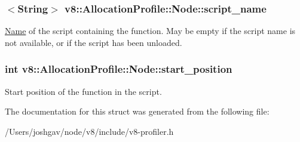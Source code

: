 \subsubsection[{\texorpdfstring{script\+\_\+name}{script_name}}]{$<${\bf String}$>$ v8\+::\+Allocation\+Profile\+::\+Node\+::script\+\_\+name}\hypertarget{structv8_1_1_allocation_profile_1_1_node_acd6567ac06a0bae713390559128e9c62}{}\label{structv8_1_1_allocation_profile_1_1_node_acd6567ac06a0bae713390559128e9c62}
\hyperlink{classv8_1_1_name}{Name} of the script containing the function. May be empty if the script name is not available, or if the script has been unloaded. 
\subsubsection[{\texorpdfstring{start\+\_\+position}{start_position}}]{\setlength{\rightskip}{0pt plus 5cm}int v8\+::\+Allocation\+Profile\+::\+Node\+::start\+\_\+position}\hypertarget{structv8_1_1_allocation_profile_1_1_node_a6caceefbf826a0425adc74331cc7a910}{}\label{structv8_1_1_allocation_profile_1_1_node_a6caceefbf826a0425adc74331cc7a910}
Start position of the function in the script. 

The documentation for this struct was generated from the following file\+:\begin{DoxyCompactItemize}
\item 
/\+Users/joshgav/node/v8/include/v8-\/profiler.\+h\end{DoxyCompactItemize}

